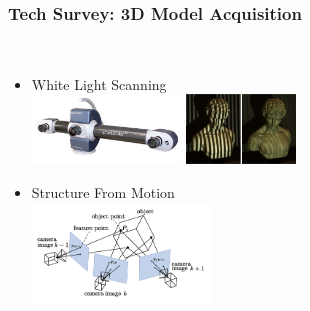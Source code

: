 \begin{frame}
  \frametitle{Tech Survey: 3D Model Acquisition}
    \begin{description}[]
      \item[Where do the models come from?] \hfill \\
      \begin{itemize}
        \item White Light Scanning \hfill \\
          \includegraphics[height=70]{images/scanner}
          \hspace{10}
          \includegraphics[height=70]{images/light_scan}
        \item Structure From Motion \hfill \\
          \includegraphics[height=100]{images/structureFromMotion}
      \end{itemize}
    \end{description}
\end{frame}

